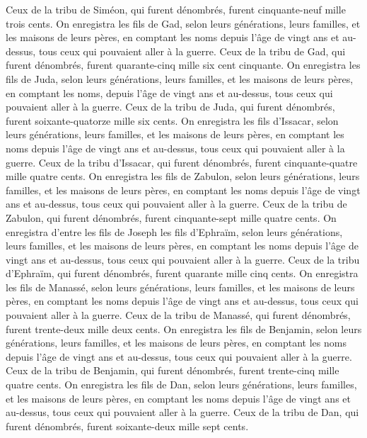 \begin{multicols}{2}
Ceux de la tribu de Siméon, qui furent dénombrés, furent cinquante-neuf mille trois cents.
On enregistra les fils de Gad, selon leurs générations, leurs familles, et les maisons de leurs pères, en comptant les noms depuis l'âge de vingt ans et au-dessus, tous ceux qui pouvaient aller à la guerre.
Ceux de la tribu de Gad, qui furent dénombrés, furent quarante-cinq mille six cent cinquante.
On enregistra les fils de Juda, selon leurs générations, leurs familles, et les maisons de leurs pères, en comptant les noms, depuis l'âge de vingt ans et au-dessus, tous ceux qui pouvaient aller à la guerre.
Ceux de la tribu de Juda, qui furent dénombrés, furent soixante-quatorze mille six cents.
On enregistra les fils d'Issacar, selon leurs générations, leurs familles, et les maisons de leurs pères, en comptant les noms depuis l'âge de vingt ans et au-dessus, tous ceux qui pouvaient aller à la guerre.
Ceux de la tribu d'Issacar, qui furent dénombrés, furent cinquante-quatre mille quatre cents.
On enregistra les fils de Zabulon, selon leurs générations, leurs familles, et les maisons de leurs pères, en comptant les noms depuis l'âge de vingt ans et au-dessus, tous ceux qui pouvaient aller à la guerre.
Ceux de la tribu de Zabulon, qui furent dénombrés, furent cinquante-sept mille quatre cents.
On enregistra d’entre les fils de Joseph les fils d'Ephraïm, selon leurs générations, leurs familles, et les maisons de leurs pères, en comptant les noms depuis l'âge de vingt ans et au-dessus, tous ceux qui pouvaient aller à la guerre.
Ceux de la tribu d'Ephraïm, qui furent dénombrés, furent quarante mille cinq cents.
On enregistra les fils de Manassé, selon leurs générations, leurs familles, et les maisons de leurs pères, en comptant les noms depuis l'âge de vingt ans et au-dessus, tous ceux qui pouvaient aller à la guerre.
Ceux de la tribu de Manassé, qui furent dénombrés, furent trente-deux mille deux cents.
On enregistra les fils de Benjamin, selon leurs générations, leurs familles, et les maisons de leurs pères, en comptant les noms depuis l'âge de vingt ans et au-dessus, tous ceux qui pouvaient aller à la guerre.
Ceux de la tribu de Benjamin, qui furent dénombrés, furent trente-cinq mille quatre cents.
On enregistra les fils de Dan, selon leurs générations, leurs familles, et les maisons de leurs pères, en comptant les noms depuis l'âge de vingt ans et au-dessus, tous ceux qui pouvaient aller à la guerre.
Ceux de la tribu de Dan, qui furent dénombrés, furent soixante-deux mille sept cents.

\end{multicols}
